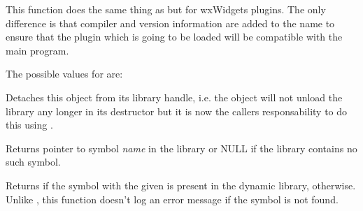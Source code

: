 



\label{wxdynamiclibrarycanonicalizepluginname}


This function does the same thing as 
 but for wxWidgets
plugins. The only difference is that compiler and version information are added
to the name to ensure that the plugin which is going to be loaded will be
compatible with the main program.

The possible values for  are:

\begin{twocollist}
\end{twocollist}


\label{wxdynamiclibrarydetach}


Detaches this object from its library handle, i.e. the object will not unload
the library any longer in its destructor but it is now the callers
responsability to do this using .


\label{wxdynamiclibrarygetsymbol}


Returns pointer to symbol {\it name} in the library or NULL if the library
contains no such symbol.




\label{wxdynamiclibraryhassymbol}


Returns \true if the symbol with the given  is present in the dynamic
library, \false otherwise. Unlike ,
this function doesn't log an error message if the symbol is not found.

